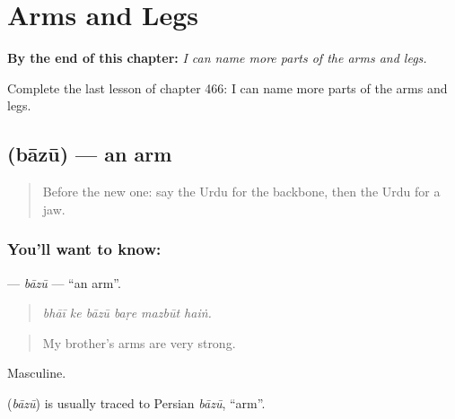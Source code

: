 
\chapter{Arms and Legs}
\label{ch:ur-arms-and-legs}

\begin{chapteropening}
\textbf{By the end of this chapter:} \emph{I can name more parts of the arms and legs.}

Complete the last lesson of chapter 466: I can name more parts of the arms and legs.
\end{chapteropening}

\section[\texorpdfstring{\ur{بازو} (bāzū)}{بازو (bāzū)}]{ (bāzū) — an arm}

\label{lesson:UR-C466-bazu}



\begin{quote}
Before the new one: say the Urdu for the backbone, then the Urdu for a jaw.
\end{quote}

\subsection*{You'll want to know: }
\textbf{} — \emph{bāzū} — \textquotedblleft{}an arm\textquotedblright{}.

\begin{quote}
     
\end{quote}

\begin{quote}
\emph{bhāī ke bāzū baṛe mazbūt haiṅ.}
\end{quote}

\begin{quote}
My brother's arms are very strong.
\end{quote}

Masculine.

\begin{cousinweb}
\textbf{} (\emph{bāzū}) is usually traced to Persian \emph{bāzū}, \textquotedblleft{}arm\textquotedblright{}.
\end{cousinweb}

